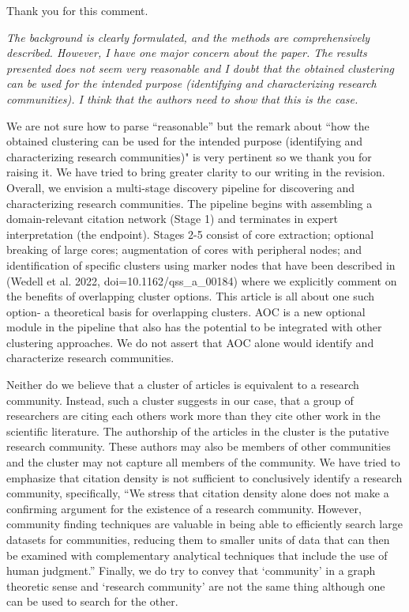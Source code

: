 \documentclass[11pt, oneside]{article}   	%
\begin{document}
Thank you for this comment.

\emph{The background is clearly formulated, and the methods are comprehensively described. However, I have one major concern about the paper. The results presented does not seem very reasonable and I doubt that the obtained clustering can be used for the intended purpose (identifying and characterizing research communities). I think that the authors need to show that this is the case.}

We are not sure how to parse ``reasonable'' but the remark about ``how the obtained clustering can be used for the intended purpose (identifying and characterizing research communities)" is very pertinent so we thank you for raising it.
We have tried to bring greater clarity to our writing in the revision. Overall, we envision a multi-stage discovery pipeline for discovering and characterizing research communities. The pipeline begins with assembling a domain-relevant citation network (Stage 1) and terminates in expert interpretation (the endpoint). Stages 2-5 consist of core extraction; optional breaking of large cores; augmentation of cores with peripheral nodes; and identification of specific clusters using marker nodes that have been described in (Wedell et al. 2022, doi=10.1162/qss\_a\_00184) where we explicitly comment on the benefits of overlapping cluster options. This article is all about one such option- a theoretical basis for overlapping clusters. AOC is a new optional module in the pipeline  that also has the potential to be integrated with other clustering approaches. We do not assert that AOC alone would identify and characterize research communities.

Neither do we believe that a cluster of articles is equivalent to a research community. Instead, such a cluster suggests in our case, that a group of researchers are citing each others work more than they cite other work in the scientific literature. The authorship of the articles in the cluster is the putative research community. These authors may also be members of other communities and the cluster may not capture all members of the community. We have tried to emphasize that citation density is not sufficient to conclusively identify a research community, specifically, ``We stress that citation density alone does not make a confirming argument for the existence of a research community. However, community finding techniques are valuable in being able to efficiently search large datasets for communities, reducing them to smaller units of data that can then be examined with complementary analytical techniques that include the use of human judgment.'' Finally, we do try to convey that `community' in a graph theoretic sense and `research community' are not the same thing although one can be used to search for the other. 
\end{document}
